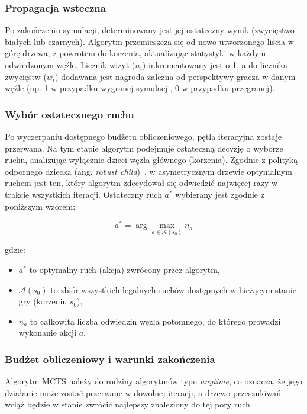 \documentclass{article}
\begin{document}
\subsubsection{Propagacja wsteczna}

Po zakończeniu symulacji, determinowany jest jej ostateczny wynik (zwycięstwo białych lub czarnych). Algorytm przemieszcza się od nowo utworzonego liścia w górę drzewa, z powrotem do korzenia, aktualizując statystyki w każdym odwiedzonym węźle. Licznik wizyt ($n_i$) inkrementowany jest o 1, a do licznika zwycięstw ($w_i$) dodawana jest nagroda zależna od perspektywy gracza w danym węźle (np. 1 w przypadku wygranej symulacji, 0 w przypadku przegranej).

\subsubsection{Wybór ostatecznego ruchu}

Po wyczerpaniu dostępnego budżetu obliczeniowego, pętla iteracyjna zostaje przerwana. Na tym etapie algorytm podejmuje ostateczną decyzję o wyborze ruchu, analizując wyłącznie dzieci węzła głównego (korzenia). Zgodnie z polityką odpornego dziecka (ang. \textit{robust child})~\cite{browne2012survey}, w asymetrycznym drzewie optymalnym ruchem jest ten, który algorytm zdecydował się odwiedzić najwięcej razy w trakcie wszystkich iteracji. Ostateczny ruch $a^*$ wybierany jest zgodnie z poniższym wzorem:

$$a^* = \arg\max_{a \in \mathcal{A}(s_0)} n_a$$

\noindent
gdzie:

\begin{itemize}
    \item $a^*$ to optymalny ruch (akcja) zwrócony przez algorytm,
    \item $\mathcal{A}(s_0)$ to zbiór wszystkich legalnych ruchów dostępnych w bieżącym stanie gry (korzeniu $s_0$),
    \item $n_a$ to całkowita liczba odwiedzin węzła potomnego, do którego prowadzi wykonanie akcji $a$.
\end{itemize}

\subsubsection{Budżet obliczeniowy i warunki zakończenia}

Algorytm MCTS należy do rodziny algorytmów typu \textit{anytime}, co oznacza, że jego działanie może zostać przerwane w dowolnej iteracji, a drzewo przeszukiwań wciąż będzie w stanie zwrócić najlepszy znaleziony do tej pory ruch.
\end{document}
